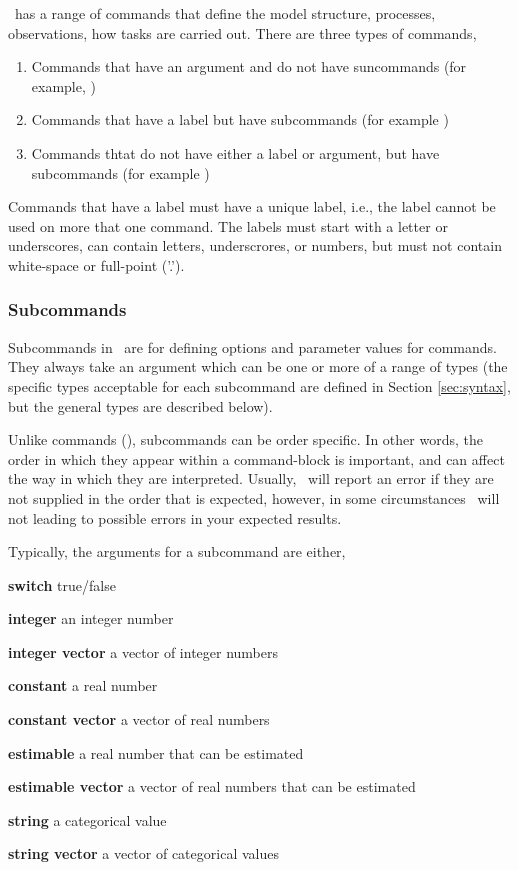 \SPM\ has a range of commands that define the model structure, processes, observations, how tasks are carried out. There are three types of commands, 
\begin{enumerate}
\item Commands that have an argument and do not have suncommands (for example, )
\item Commands that have a label but have subcommands (for example )
\item Commands thtat do not have either a label or argument, but have subcommands (for example )
\end{enumerate}

Commands that have a label must have a unique label, i.e., the label cannot be used on more that one command. The labels must start with a letter or underscores, can contain letters, underscrores, or numbers, but must not contain white-space or full-point ('.').

\subsubsection{Subcommands}

Subcommands in \SPM\ are for defining options and parameter values for commands. They always take an argument which can be one or more of a range of types (the specific types acceptable for each subcommand are defined in Section \ref{sec:syntax}, but the general types are described below). 

Unlike commands (), subcommands can be order specific. In other words, the order in which they appear within a command-block is important, and can affect the way in which they are interpreted. Usually, \SPM\ will report an error if they are not supplied in the order that is expected, however, in some circumstances \SPM\ will not \textemdash leading to possible errors in your expected results.  

Typically, the arguments for a subcommand are either,

\begin{description}
\item \textbf{switch} true/false 
\item \textbf{integer} an integer number
\item \textbf{integer vector} a vector of integer numbers
\item \textbf{constant} a real number 
\item \textbf{constant vector} a vector of real numbers
\item \textbf{estimable} a real number that can be estimated
\item \textbf{estimable vector} a vector of real numbers that can be estimated
\item \textbf{string} a categorical value
\item \textbf{string vector} a vector of categorical values
\end{description}

